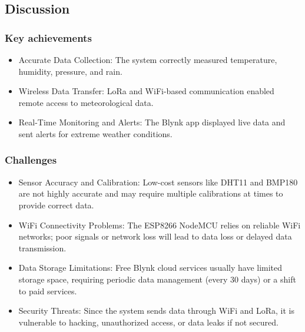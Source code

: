 \documentclass[conference, onecolumn]{IEEEtran}
\begin{document}
\subsection{Discussion}
\subsubsection{\textbf{Key achievements}}
\begin{itemize}
    \item Accurate Data Collection: The system correctly measured temperature, humidity, pressure, and rain.
    \item Wireless Data Transfer: LoRa and WiFi-based communication enabled remote access to meteorological data.
    \item Real-Time Monitoring and Alerts: The Blynk app displayed live data and sent alerts for extreme weather conditions.
\end{itemize}

\subsubsection{\textbf{Challenges}}
\begin{itemize}
    \item Sensor Accuracy and Calibration: Low-cost sensors like DHT11 and BMP180 are not highly accurate and may require multiple calibrations at times to provide correct data.
    \item WiFi Connectivity Problems: The ESP8266 NodeMCU relies on reliable WiFi networks; poor signals or network loss will lead to data loss or delayed data transmission.
    \item Data Storage Limitations: Free Blynk cloud services usually have limited storage space, requiring periodic data management (every 30 days) or a shift to paid services.
    \item Security Threats: Since the system sends data through WiFi and LoRa, it is vulnerable to hacking, unauthorized access, or data leaks if not secured.
\end{itemize}
\end{document}
